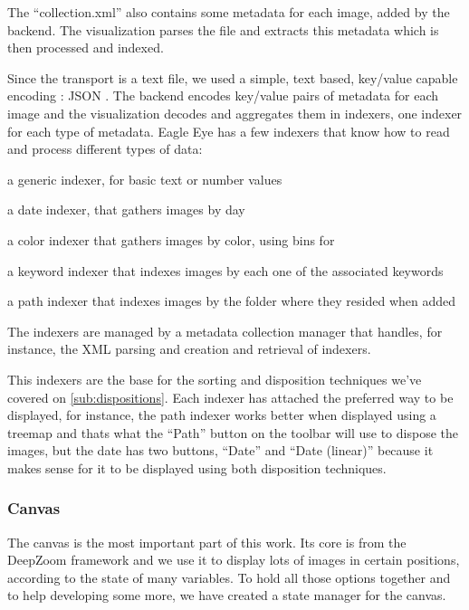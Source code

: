 The ``collection.xml'' also contains some metadata for each image, added by the backend. The visualization parses the file and extracts this metadata which is then processed and indexed.

Since the transport is a text file, we used a simple, text based, key/value capable encoding : JSON . The backend encodes key/value pairs of metadata for each image  and the visualization decodes and aggregates them in indexers, one indexer for each type of metadata. Eagle Eye has a few indexers that know how to read and process different types of data:
\begin{myitemize}
	\item{a generic indexer, for basic text or number values}
	\item{a date indexer, that gathers images by day}
	\item{a color indexer that gathers images by color, using  bins for }
	\item{a keyword indexer that indexes images by each one of the associated keywords}
	\item{a path indexer that indexes images by the folder where they resided when added}
\end{myitemize}

The indexers are managed by a metadata collection manager that handles, for instance, the XML parsing and creation and retrieval of indexers.

This indexers are the base for the sorting and disposition techniques we've covered on \ref{sub:dispositions}. Each indexer has attached the preferred way to be displayed, for instance, the path indexer works better when displayed using a treemap and thats what the ``Path'' button on the toolbar will use to dispose the images, but the date has two buttons, ``Date'' and ``Date (linear)'' because it makes sense for it to be displayed using both disposition techniques. 




\subsubsection{Canvas}

The canvas is the most important part of this work. Its core is from the DeepZoom framework and we use it to display lots of images in certain positions, according to the state of many variables. To hold all those options together and to help developing some more, we have created a state manager for the canvas.

